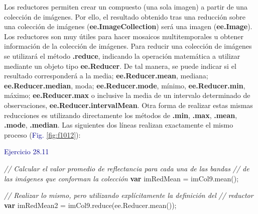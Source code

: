 \documentclass[
  12pt,
  letterpaper,
  twoside]{book}
\newenvironment{Shaded}{\begin{snugshade}}{\end{snugshade}}
\newcommand{\AttributeTok}[1]{\textcolor[rgb]{0.48,0.12,0.64}{#1}}
\newcommand{\CommentTok}[1]{\textcolor[rgb]{0.24,0.58,0.00}{\textit{#1}}}
\newcommand{\FunctionTok}[1]{\textcolor[rgb]{0.48,0.12,0.64}{#1}}
\newcommand{\KeywordTok}[1]{\textcolor[rgb]{0.00,0.00,0.00}{\textbf{#1}}}
\newcommand{\NormalTok}[1]{#1}
\newcommand{\OperatorTok}[1]{\textcolor[rgb]{0.00,0.00,0.00}{#1}}
\newcommand\boldpurple[1]{\textcolor{darkpurple}{\textbf{#1}}}
\begin{document}
Los reductores permiten crear un compuesto (una sola imagen) a partir de una colección de imágenes. Por ello, el resultado obtenido tras una reducción sobre una colección de imágenes (\boldpurple{ee.ImageCollection}) será una imagen (\boldpurple{ee.Image}). Los reductores son muy útiles para hacer mosaicos multitemporales u obtener información de la colección de imágenes. Para reducir una colección de imágenes se utilizará el método \boldpurple{.reduce}, indicando la operación matemática a utilizar mediante un objeto tipo \boldpurple{ee.Reducer}. De tal manera, se puede indicar si el resultado corresponderá a la media; \boldpurple{ee.Reducer.mean}, mediana; \boldpurple{ee.Reducer.median}, moda; \boldpurple{ee.Reducer.mode}, mínimo, \boldpurple{ee.Reducer.min}, máximo; \boldpurple{ee.Reducer.max} o inclusive la media de un intervalo determinado de observaciones, \boldpurple{ee.Reducer.intervalMean}. Otra forma de realizar estas mismas reducciones es utilizando directamente los métodos de \boldpurple{.min}, \boldpurple{.max}, \boldpurple{.mean}, \boldpurple{.mode}, \boldpurple{.median}. Las siguientes dos líneas realizan exactamente el mismo proceso (\textcolor{darkblue}{Fig.} \ref{fig:f1012}):

\textcolor{darkblue}{Ejercicio 28.11}

\begin{Shaded}
\begin{Highlighting}[]
\CommentTok{// Calcular el valor promedio de reflectancia para cada una de las bandas }
\CommentTok{// de las imágenes que conforman la colección}
\KeywordTok{var}\NormalTok{ imRedMean }\OperatorTok{=}\NormalTok{ imCol9}\OperatorTok{.}\FunctionTok{mean}\NormalTok{()}\OperatorTok{;}

\CommentTok{// Realizar lo mismo, pero utilizando explícitamente la definición del }
\CommentTok{// reductor}
\KeywordTok{var}\NormalTok{ imRedMean2 }\OperatorTok{=}\NormalTok{ imCol9}\OperatorTok{.}\FunctionTok{reduce}\NormalTok{(ee}\OperatorTok{.}\AttributeTok{Reducer}\OperatorTok{.}\FunctionTok{mean}\NormalTok{())}\OperatorTok{;}
\end{Highlighting}
\end{Shaded}
\end{document}
